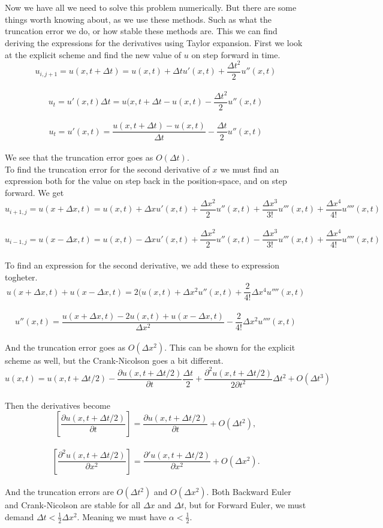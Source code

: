 \documentclass[a4paper,12pt, english]{article}
\begin{document}
\subsection*{\ }
Now we have all we need to solve this problem numerically. But there are some things worth knowing about, as we use these methods. Such as what the truncation error we do, or how stable these methods are. This we can find deriving the expressions for the derivatives using Taylor expansion.
First we look at the explicit scheme and find the new value of $u$ on step forward in time.
\\
$$u_{i,j+1} = u(x,t + \Delta t) = u(x,t) +  \Delta t u'(x,t) + \frac{\Delta t^2}{2}u''(x,t)$$
\\
$$u_t = u'(x,t)\Delta t = u(x,t + \Delta t - u(x,t) - \frac{\Delta t^2}{2}u''(x,t)$$
\\
$$u_t = u'(x,t) = \frac{u(x,t + \Delta t) - u(x,t)}{\Delta t} - \frac{\Delta t}{2}u''(x,t)$$
\\
We see that the truncation error goes as $O (\Delta t)$.
\\
To find the truncation error for the second derivative of $x$ we must find an expression both for the value on step back in the position-space, and on step forward.
We get 
\\
$$u_{i+1,j} = u(x + \Delta x,t) = u(x,t) + \Delta xu'(x,t) + \frac{\Delta x^2}{2}u''(x,t) + \frac{\Delta x^3}{3!}u'''(x,t) + \frac{\Delta x^4}{4!}u''''(x,t)$$
\\
$$u_{i-1,j} = u(x - \Delta x,t) = u(x,t) - \Delta xu'(x,t) + \frac{\Delta x^2}{2}u''(x,t) - \frac{\Delta x^3}{3!}u'''(x,t) + \frac{\Delta x^4}{4!}u''''(x,t)$$
\\
To find an expression for the second derivative, we add these to expression togheter.
\\
$$u(x + \Delta x,t) + u(x - \Delta x,t) = 2(u(x,t) + \Delta x^2 u''(x,t) + \frac {2}{4!}\Delta x^4u''''(x,t)$$
\\
$$u''(x,t) = \frac{u(x + \Delta x,t) - 2u(x,t) + u(x -\Delta x,t)}{\Delta x^2} - \frac{2}{4!}\Delta x^2u''''(x,t)$$
\\
And the truncation error goes as $O(\Delta x^2)$.
This can be shown for the explicit scheme as well, but the Crank-Nicolson goes a bit different.
\\
$$u(x,t) = u(x,t + \Delta t/2) - \frac{\partial u(x,t + \Delta t/2)}{\partial t}\frac{\Delta t}{2} + \frac{\partial^2 u(x,t + \Delta t/2)}{2\partial t^2}\Delta t^2 + O(\Delta t^3)$$
\\
Then the derivatives become
\\
$$\left[ \frac{\partial u(x,t + \Delta t/2)}{\partial t}\right] = \frac{\partial u(x,t + \Delta t/2)}{\partial t} + O(\Delta t^2),$$
\\
$$\left[ \frac{\partial^2 u(x,t + \Delta t/2)}{\partial x^2}\right] = \frac{\partial' u(x,t + \Delta t/2)}{\partial x^2} + O(\Delta x^2).$$
\\
And the truncation errors are $O(\Delta t^2)$ and $O(\Delta x^2)$.
Both Backward Euler and Crank-Nicolson are stable for all $\Delta x$ and $\Delta t$, but for Forward Euler, we must demand $\Delta t < \frac{1}{2} \Delta x^2$. Meaning we must have $\alpha < \frac{1}{2}$.
\end{document}
